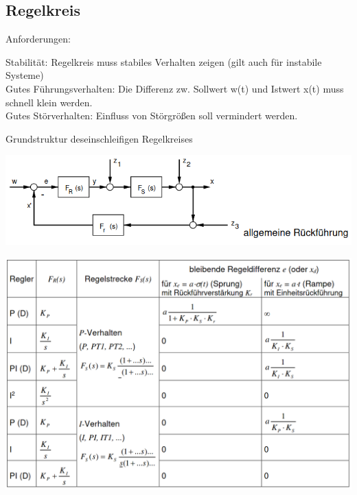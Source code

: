 \documentclass[10pt,a4paper]{article}
\begin{document}
  \subsection{Regelkreis}
  Anforderungen:
  \begin{mdframed}[style=exercise]
        Stabilität: Regelkreis muss stabiles Verhalten zeigen (gilt auch für instabile Systeme)\\
        Gutes Führungsverhalten: Die Differenz zw. Sollwert w(t) und Istwert x(t) muss schnell klein werden.\\
        Gutes Störverhalten: Einfluss von Störgrößen soll vermindert werden.
  \end{mdframed}
  Grundstruktur deseinschleifigen Regelkreises

  \includegraphics[width=.45\textwidth]{Figures/einschleifiger Regelkreis.png}

  \includegraphics[width=.45\textwidth]{Figures/Reglerauswahl.png}
\end{document}
